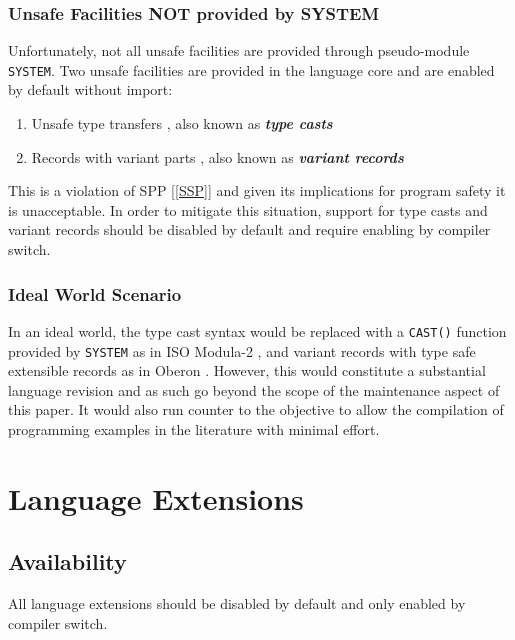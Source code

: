 \documentclass[10pt,a4paper]{article}
\renewcommand{\emph}[1]{\textbf{\textit{#1}}}
\begin{document}
\subsubsection{Unsafe Facilities NOT provided by SYSTEM}
Unfortunately, not all unsafe facilities are provided through pseudo-module
\verb|SYSTEM|. Two unsafe facilities are provided in the language core and are
enabled by default without import:

\begin{enumerate}[itemindent=-0.75em]
\item Unsafe type transfers \cite[p.119]{Wirth88}, also known as
\emph{type casts}
\item Records with variant parts \cite[p.71, p.138]{Wirth88}, also known as
\emph{variant records}
\end{enumerate}

\par\noindent This is a violation of SPP [\ref{SSP}] and given its implications
for program safety it is unacceptable. In order to mitigate this situation,
support for type casts and variant records should be disabled by default and
require enabling by compiler switch.

\subsubsection{Ideal World Scenario}

In an ideal world, the type cast syntax would be replaced with a \verb|CAST()|
function provided by \verb|SYSTEM| as in ISO Modula-2 \cite{ISO96}, and variant
records with type safe extensible records as in Oberon \cite{Wirth90}. However,
this would constitute a substantial language revision and as such go beyond the
scope of the maintenance aspect of this paper. It would also run counter to the
objective to allow the compilation of programming examples in the literature
with minimal effort.


\section{Language Extensions}

\subsection{Availability}
All language extensions should be disabled by default and only enabled by
compiler switch.
\end{document}
